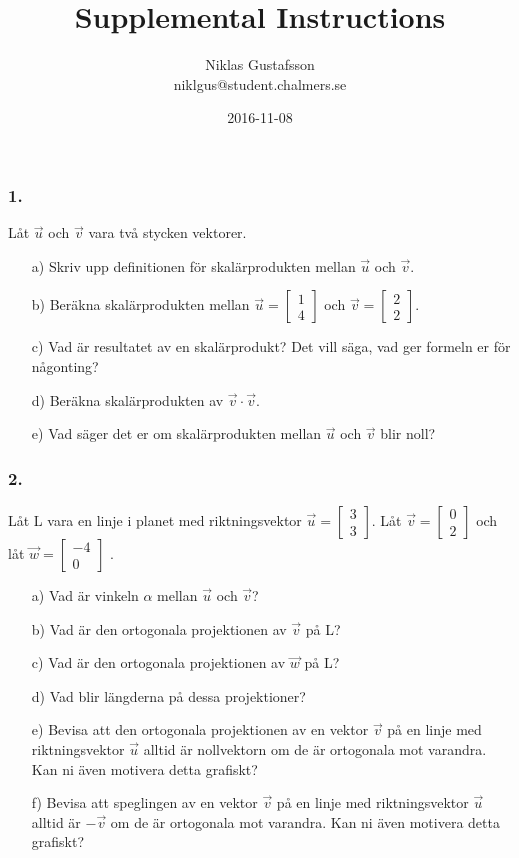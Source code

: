 \documentclass{article}
\title{Supplemental Instructions}
\author{Niklas Gustafsson \\ 
		\small{niklgus@student.chalmers.se}
}
\date{
      2016-11-08
     }
\begin{document}
\maketitle
\subsubsection*{1.}
Låt $\vec{u}$ och $\vec{v}$ vara två stycken vektorer.
\begin{itemize}
\item[a) ] Skriv upp definitionen för skalärprodukten mellan $\vec{u}$ och $\vec{v}$.
\item[b) ] Beräkna skalärprodukten mellan $\vec{u} = \begin{bmatrix} 1 \\ 4 \end{bmatrix}$ och $\vec{v} = \begin{bmatrix} 2 \\ 2 \end{bmatrix}.$
\item[c) ] Vad är resultatet av en skalärprodukt? Det vill säga, vad ger formeln er för någonting?
\item[d) ] Beräkna skalärprodukten av $\vec{v} \cdot \vec{v}$.
\item[e) ] Vad säger det er om skalärprodukten mellan $\vec{u}$ och $\vec{v}$ blir noll?
\end{itemize}

\subsubsection*{2.}
Låt L vara en linje i planet med riktningsvektor $\vec{u} = \begin{bmatrix} 3 \\ 3 \end{bmatrix}$. Låt $\vec{v} = \begin{bmatrix} 0 \\ 2 \end{bmatrix}$ och låt $\vec{w} = \begin{bmatrix} -4 \\ 0 \end{bmatrix}$ .
\begin{itemize}
\item[a) ] Vad är vinkeln $\alpha$ mellan $\vec{u}$ och $\vec{v}$?
\item[b) ] Vad är den ortogonala projektionen av $\vec{v}$ på L?
\item[c) ] Vad är den ortogonala projektionen av $\vec{w}$ på L?
\item[d) ] Vad blir längderna på dessa projektioner?
\item[e) ] Bevisa att den ortogonala projektionen av en vektor $\vec{v}$ på en linje med riktningsvektor $\vec{u}$ alltid är nollvektorn om de är ortogonala mot varandra. Kan ni även motivera detta grafiskt? 
\item[f) ] Bevisa att speglingen av en vektor $\vec{v}$ på en linje med riktningsvektor $\vec{u}$ alltid är $-\vec{v}$ om de är ortogonala mot varandra. Kan ni även motivera detta grafiskt?
\end{itemize}   
\end{document}
